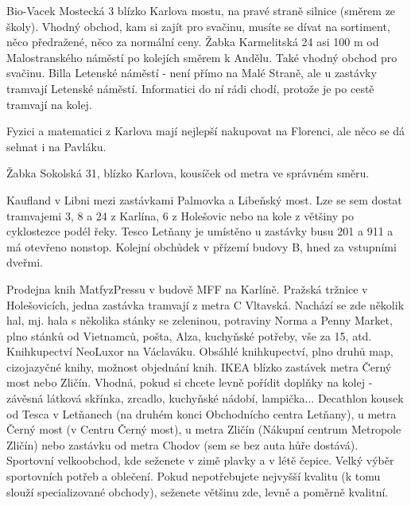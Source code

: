 Bio-Vacek Mostecká 3 blízko Karlova mostu, na pravé straně silnice (směrem ze školy). Vhodný obchod, kam si zajít pro svačinu, musíte se dívat na sortiment, něco předražené, něco za normální ceny.
Žabka Karmelitská 24 asi 100 m od Malostranského náměstí po kolejích směrem k Andělu. Také vhodný obchod pro svačinu.
Billa Letenské náměstí - není přímo na Malé Straně, ale u zastávky tramvají Letenské náměstí. Informatici do ní rádi chodí, protože je po cestě tramvají na kolej.

Fyzici a matematici z Karlova mají nejlepší nakupovat na Florenci, ale něco se dá sehnat i na Pavláku.

Žabka Sokolská 31, blízko Karlova, kousíček od metra ve správném směru.

Kaufland v Libni mezi zastávkami Palmovka a Libeňský most. Lze se sem dostat tramvajemi 3, 8 a 24 z Karlína, 6 z Holešovic nebo na kole z většiny po cyklostezce podél řeky.
Tesco Letňany je umístěno u zastávky busu 201 a 911 a má otevřeno nonstop.
Kolejní obchůdek v přízemí budovy B, hned za vstupními dveřmi.

Prodejna knih MatfyzPressu v budově MFF na Karlíně.
Pražská tržnice v Holešovicích, jedna zastávka tramvají z metra C Vltavská. Nachází se zde několik hal, mj. hala s několika stánky se zeleninou, potraviny Norma a Penny Market, plno stánků od Vietnamců, pošta, Alza, kuchyňské potřeby, vše za 15, atd.
Knihkupectví NeoLuxor na Václaváku. Obsáhlé knihkupectví, plno druhů map, cizojazyčné knihy, možnost objednání knih.
IKEA blízko zastávek metra Černý most nebo Zličín. Vhodná, pokud si chcete levně pořídit doplňky na kolej - závěsná látková skřínka, zrcadlo, kuchyňské nádobí, lampička...
Decathlon kousek od Tesca v Letňanech (na druhém konci Obchodnícho centra Letňany), u metra Černý most (v Centru Černý most), u metra Zličín (Nákupní centrum Metropole Zličín) nebo zastávku od metra Chodov (sem se bez auta hůře dostává). Sportovní velkoobchod, kde seženete v zimě plavky a v létě čepice. Velký výběr sportovních potřeb a oblečení. Pokud nepotřebujete nejvyšší kvalitu (k tomu slouží specializované obchody), seženete většinu zde, levně a poměrně kvalitní.




